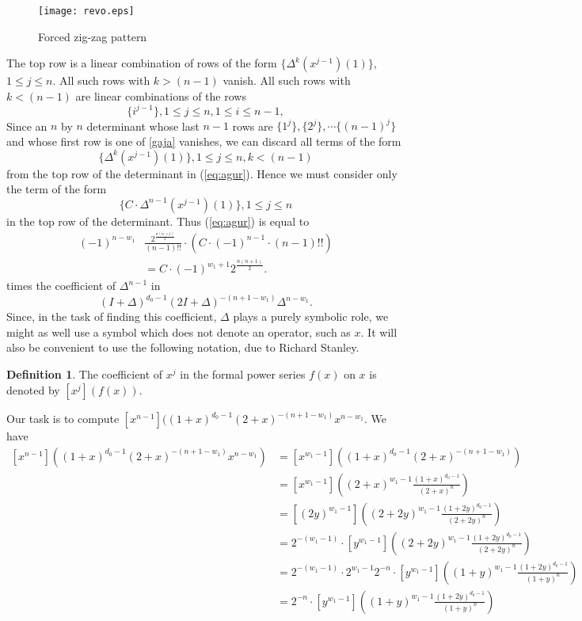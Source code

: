 \documentclass[10pt,reqno]{amsart}
\theoremstyle{plain}
\theoremstyle{definition}
\newtheorem{Def}{Definition}
\theoremstyle{remark}
\begin{document}
\begin{figure}
        \begin{minipage}[b]{0.5\linewidth}
                \centering \texttt{[image: revo.eps]}
                \caption{Forced zig-zag pattern}\label{fig:revo}
        \end{minipage}%
\end{figure}

The top row is a linear combination of rows of the form
$\{\Delta^k(x^{j-1})(1)\}$, $1\leq j\leq n$. All such rows with 
$k>(n-1)$ vanish. All such rows with $k<(n-1)$ are linear combinations of 
the rows
\[
\{i^{j-1}\}, 1\leq j\leq n, 1\leq i\leq n-1,\label{gaja}
\]
Since an $n$ by $n$ determinant whose last $n-1$ rows are
$\{1^j\},\{2^j\},\dotsb \{(n-1)^j\}$ and whose first row is one of
\ref{gaja} vanishes, we can discard all terms of the form
\[\{\Delta^k(x^{j-1})(1)\}, 1\leq j\leq n, k<(n-1)\]
from the top row of the determinant in
(\ref{eq:agur}). Hence we must consider only
the term of the form 
\[\{C\cdot \Delta^{n-1}(x^{j-1})(1)\} , 1\leq j\leq n\]
in the top row of the determinant. Thus (\ref{eq:agur}) is equal to
\[
\begin{aligned}
\label{eq:malbona}
(-1)^{n-w_1} &\frac{2^{\frac{n(n+1)}{2} }}{(n-1)!!}\cdot 
(C\cdot (-1)^{n-1}\cdot (n-1)!!)\\
&= C\cdot (-1)^{w_1+1} 2^{\frac{n(n+1)}{2}}.
\end{aligned}
\]
times
the coefficient of $\Delta^{n-1}$ in \[(I+\Delta)^{d_0-1}
(2I+\Delta)^{-(n+1-w_1)} \Delta^{n-w_1}.\] Since, in the task of finding 
this coefficient, $\Delta$ plays a purely symbolic role, we might
as well use a symbol which does not denote an operator, such as $x$.
It will also be convenient to use the following notation, due to
Richard Stanley.
\begin{Def} The coefficient of $x^j$ in the formal power series $f(x)$
on $x$ is denoted by $[x^j](f(x))$.
\end{Def}

Our task is to compute 
$[x^{n-1}]((1+x)^{d_0-1} (2+x)^{-(n+1-w_1)} x^{n-w_1}$. We have
\[
\begin{aligned}
\label{eq:seventeen}
[x^{n-1}]((1+x)^{d_0-1} (2+x)^{-(n+1-w_1)} x^{n-w_1}) &=
[x^{w_1-1}]((1+x)^{d_0-1} (2+x)^{-(n+1-w_1)}) \\
&= [x^{w_1-1}]((2+x)^{w_1-1} \frac{(1+x)^{d_0-1}}{(2+x)^n}) \\
&= [(2y)^{w_1-1}]((2+2y)^{w_1-1} \frac{(1+2y)^{d_0-1}}{(2+2y)^n}) \\
&= 2^{-(w_1-1)} \cdot
[y^{w_1-1}]((2+2y)^{w_1-1} \frac{(1+2y)^{d_0-1}}{(2+2y)^n}) \\
&= 2^{-(w_1-1)} \cdot 2^{w_1-1} 2^{-n} \cdot
[y^{w_1-1}]((1+y)^{w_1-1} \frac{(1+2y)^{d_0-1}}{(1+y)^n}) \\
&= 2^{-n} \cdot
[y^{w_1-1}]((1+y)^{w_1-1} \frac{(1+2y)^{d_0-1}}{(1+y)^n})
\end{aligned}
\]
\end{document}
